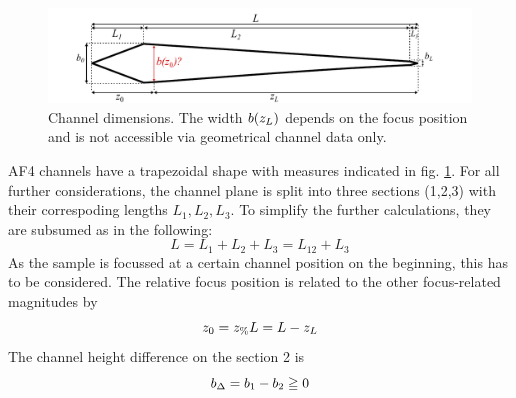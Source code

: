 \begin{figure}[H]  
  \begin{center}
    \includegraphics[width=\linewidth]{./images/fffChannelMeasures.pdf}    
  \end{center}
  \caption[Channel dimensions]{Channel dimensions. The width $b(z_L)$ depends on the focus position and is not 
  accessible via geometrical channel data only.}
  \label{fig:fffChannelMeasures} 
\end{figure}AF4 channels have a trapezoidal shape with measures indicated in fig. \ref{fig:fffChannelMeasures}.
For all further considerations, the channel plane is split into three sections (1,2,3) with their correspoding lengths $L_1, L_2, L_3$. To simplify the further calculations, they are subsumed as in the following:
\begin{equation}
  L
  = L_1 + L_2 + L_3 = L_{12} + L_3   
\end{equation}
As the sample is focussed at a certain channel position on the beginning, this has to be considered. The relative focus position \zP is related to the other focus-related magnitudes by
\begin{equation}
  z_0 = z_\text{\%} L = L - z_L
\end{equation}
The channel height difference \bDelta on the section 2 is
\begin{equation}
  b_\Delta = b_1 - b_2 \geqq 0
\end{equation}

